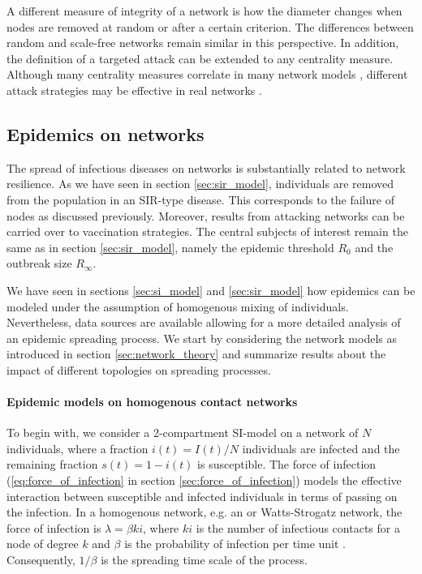 A different measure of integrity of a network is how the diameter changes when nodes are removed at random or after a certain criterion.
The differences between random and scale-free networks remain similar in this perspective.
In addition, the definition of a targeted attack can be extended to any centrality measure.
Although many centrality measures correlate in many network models \citep{dynamical_processes}, different attack strategies may be effective in real networks \citep{holme:2002}.

\subsection{Epidemics on networks}\label{sec:epi_networks}
The spread of infectious diseases on networks is substantially related to network resilience.
As we have seen in section \ref{sec:sir_model}, individuals are removed from the population in an SIR-type disease.
This corresponds to the failure of nodes as discussed previously.
Moreover, results from attacking networks can be carried over to vaccination strategies.
The central subjects of interest remain the same as in section \ref{sec:sir_model}, namely the epidemic threshold $R_0$ and the outbreak size $R_\infty $.

We have seen in sections \ref{sec:si_model} and \ref{sec:sir_model} how epidemics can be modeled under the assumption of homogenous mixing of individuals.
Nevertheless, data sources are available allowing for a more detailed analysis of an epidemic spreading process.
We start by considering the network models as introduced in section \ref{sec:network_theory} and summarize results about the impact of different topologies on spreading processes.

\paragraph{Epidemic models on homogenous contact networks\color{Cayenne}{.}}
To begin with, we consider a 2-compartment SI-model on a network of $N$ individuals, where a fraction $i(t)=I(t)/N$ individuals are infected and the remaining fraction $s(t)=1-i(t)$ is susceptible.
The force of infection (\eqref{eq:force_of_infection} in section \ref{sec:force_of_infection}) models the effective interaction between susceptible and infected individuals in terms of passing on the infection.
In a homogenous network, e.g. an \ER or Watts-Strogatz network, the force of infection is $\lambda = \beta ki$, where $ki$ is the number of infectious contacts for a node of degree $k$ and $\beta $ is the probability of infection per time unit \citep{dynamical_processes}.
Consequently, $1/\beta $ is the spreading time scale of the process.


